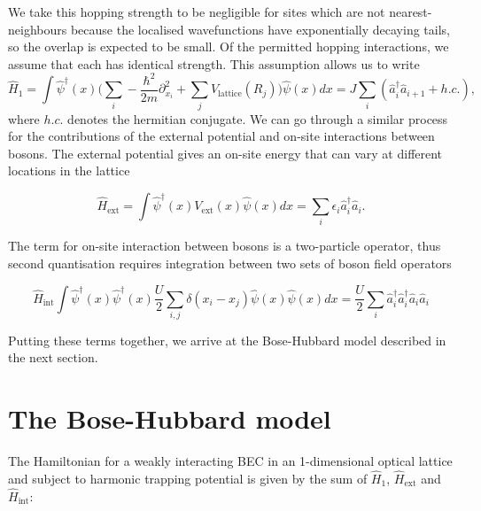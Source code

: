 \documentclass[a4paper,10pt]{article}
\begin{document}

We take this hopping strength to be negligible
for sites which are not nearest-neighbours because the localised wavefunctions have exponentially decaying tails, so the overlap is expected to be small. Of the permitted hopping interactions, we assume 
that each has identical strength. This assumption allows us to write
\begin{equation}
 \hat{H}_1=\int  \hat{\psi}^{\dagger}(x) \bigg(  \sum_{i}-\frac{\hbar^{2}}{2m}  \partial_{x_{i}}^2+\sum_{j}V_{\text{lattice}}(R_{j})  \bigg)    \hat{\psi}(x)dx=J\sum_{i}(\hat{a}^\dagger_{i}\hat{a}_{i+1}+h.c.),
\end{equation}
where $h.c.$ denotes the hermitian conjugate.
We can go through a similar process for the contributions of the external potential and on-site interactions between bosons. The external potential gives an on-site energy that can vary
at different locations in the lattice

\begin{equation}
 \hat{H}_{\text{ext}}=\int  \hat{\psi}^{\dagger}(x) V_{\text{ext}}(x)  \hat{\psi}(x)dx = \sum_i \epsilon_i \hat{a}_i^{\dagger}\hat{a}_i.
\end{equation}

The term for on-site interaction between bosons is a two-particle operator, thus second quantisation requires integration between two sets of boson field operators 

\begin{equation}
\hat{H}_{\text{int}} \int  \hat{\psi}^{\dagger}(x)\hat{\psi}^{\dagger}(x) \frac{U}{2}\sum_{i,j}\delta(x_{i}-x_{j})  \hat{\psi}(x) \hat{\psi}(x) dx = \frac{U}{2}\sum_i \hat{a}_i^{\dagger}\hat{a}_i^{\dagger}\hat{a}_i\hat{a}_i
\end{equation}


Putting these terms together, we arrive at the Bose-Hubbard model described in the next section.
\newpage



\newpage
\section{The Bose-Hubbard model}

The Hamiltonian for a weakly interacting BEC in an 1-dimensional optical lattice and subject to harmonic trapping potential is given by the sum of $\hat{H}_1$, $\hat{H}_{\text{ext}}$ and $\hat{H}_{\text{int}}$:
\end{document}
